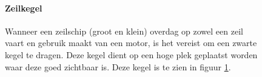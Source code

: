 \begin{figure}[H]
	\centering
	\begin{minipage}[t]{0.75\textwidth}
		\paragraph{Zeilkegel}
		Wanneer een zeilschip (groot en klein) overdag op zowel een zeil vaart en gebruik maakt van een motor, is het vereist om een zwarte kegel te dragen. Deze kegel dient op een hoge plek geplaatst worden waar deze goed zichtbaar is. Deze kegel is te zien in figuur \ref{pic:optisch:zeilkegel}.
	\end{minipage}
	\hfill
	\begin{minipage}[t]{0.22\textwidth}
		\RemoveLine
		\caption{}
		\label{pic:optisch:zeilkegel}
	\end{minipage}
\end{figure}

